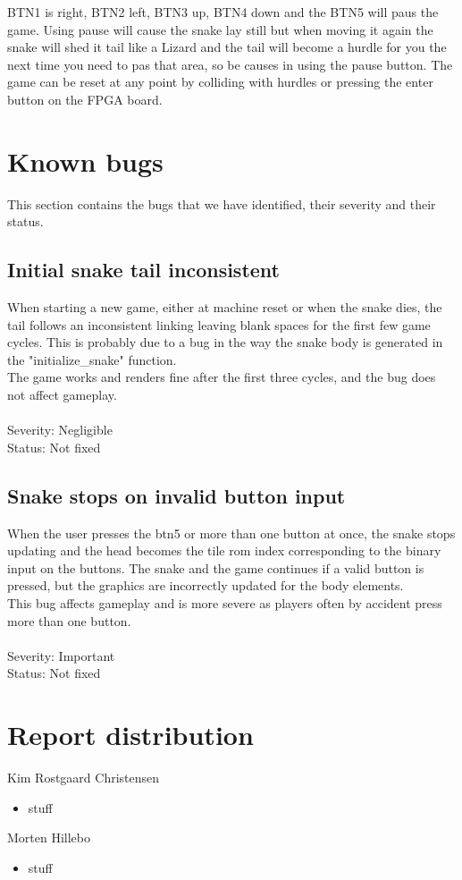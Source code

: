 \documentclass{acm_proc_article-sp}
\begin{document}
BTN1 is right, BTN2 left, BTN3 up, BTN4 down and the BTN5 will paus the game. Using pause will cause the snake lay still but when moving it again the snake will shed it tail like a Lizard and the tail will become a hurdle for you the next time you need to pas that area, so be causes in using the pause button.
The game can be reset at any point by colliding with hurdles or pressing the enter button on the FPGA board.

\section{Known bugs}
This section contains the bugs that we have identified, their severity and their status.
\subsection{Initial snake tail inconsistent}
When starting a new game, either at machine reset or when the snake dies, the tail follows an inconsistent linking leaving blank spaces for the first few game cycles. This is probably due to a bug in the way the snake body is generated in the "initialize\_snake" function.\\
The game works and renders fine after the first three cycles, and the bug does not affect gameplay.\\\\
Severity: Negligible\\
Status: Not fixed

\subsection{Snake stops on invalid button input}
When the user presses the btn5 or more than one button at once, the snake stops updating and the head becomes the tile rom index corresponding to the binary input on the buttons. The snake and the game continues if a valid button is pressed, but the graphics are incorrectly updated for the body elements.\\
This bug affects gameplay and is more severe as players often by accident press more than one button.\\\\
Severity: Important\\
Status: Not fixed

\section{Report distribution}
Kim Rostgaard Christensen
\begin{itemize}
\item stuff
\end{itemize}

Morten Hillebo
\begin{itemize}
\item stuff
\end{itemize}

\end{document}
